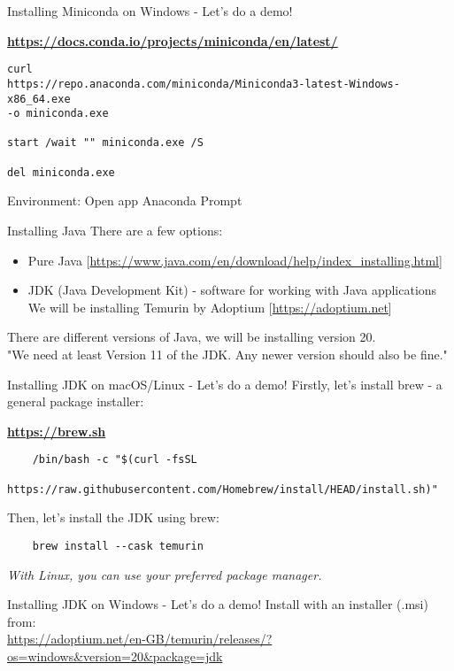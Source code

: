 \documentclass[aspectratio=169,hyperref={unicode}]{beamer}
\begin{document}
\begin{frame}[fragile]{Installing Miniconda on Windows - Let's do a demo!}
\begin{center}
	\textbf{\url{https://docs.conda.io/projects/miniconda/en/latest/}}
\end{center}
\begin{verbatim}
curl 
https://repo.anaconda.com/miniconda/Miniconda3-latest-Windows-x86_64.exe 
-o miniconda.exe

start /wait "" miniconda.exe /S

del miniconda.exe
\end{verbatim}
Environment: Open app Anaconda Prompt
\end{frame}

\begin{frame}{Installing Java}
There are a few options:
\begin{itemize}
	\item Pure Java [\url{https://www.java.com/en/download/help/index_installing.html}]
	\item JDK (Java Development Kit) - software for working with Java applications\\ We will be installing Temurin by Adoptium [\url{https://adoptium.net}]
\end{itemize}
There are different versions of Java, we will be installing version 20. \\
"We need at least Version 11 of the JDK. Any newer version should also be fine."
\end{frame}

\begin{frame}[fragile]{Installing JDK on macOS/Linux - Let's do a demo!}
Firstly, let's install brew - a general package installer:
\begin{center}
	\textbf{\url{https://brew.sh}}
\end{center}

\begin{verbatim}
	/bin/bash -c "$(curl -fsSL 
	https://raw.githubusercontent.com/Homebrew/install/HEAD/install.sh)"
\end{verbatim}
Then, let's install the JDK using brew:
\begin{verbatim}
	brew install --cask temurin
\end{verbatim}
\textit {With Linux, you can use your preferred package manager.}
\end{frame}

\begin{frame}[fragile]{Installing JDK on Windows - Let's do a demo!}
\small
Install with an installer (.msi) from:\\

\url{https://adoptium.net/en-GB/temurin/releases/?os=windows&version=20&package=jdk}

\end{frame}
\end{document}
